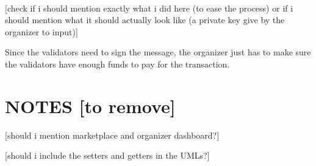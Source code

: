 ~

[check if i should mention exactly what i did here (to ease the process) or if i should mention what it should actually look like (a private key give by the organizer to input)]

Since the validators need to sign the message, the organizer just has to make sure the validators have enough funds to pay for the transaction.

\section{NOTES [to remove]}

 [should i mention marketplace and organizer dashboard?]

 [should i include the setters and getters in the UMLs?]
